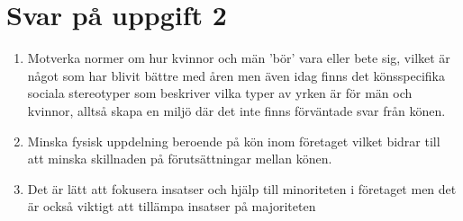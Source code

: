\documentclass[a4paper,12pt]{article}
\begin{document}
\section*{Svar på uppgift 2}
\begin{enumerate}
    \item Motverka normer om hur kvinnor och män 'bör' vara eller bete sig,
          vilket är något som har blivit bättre med åren men även idag finns det
          könsspecifika sociala stereotyper som beskriver vilka typer av yrken är för
          män och kvinnor, alltså skapa en miljö där det inte finns förväntade svar
          från könen.
    \item Minska fysisk uppdelning beroende på kön inom företaget vilket bidrar
          till att minska skillnaden på förutsättningar mellan könen.
    \item Det är lätt att fokusera insatser och hjälp till minoriteten i
          företaget men det är också viktigt att tillämpa insatser på majoriteten
\end{enumerate}
%
\end{document}
